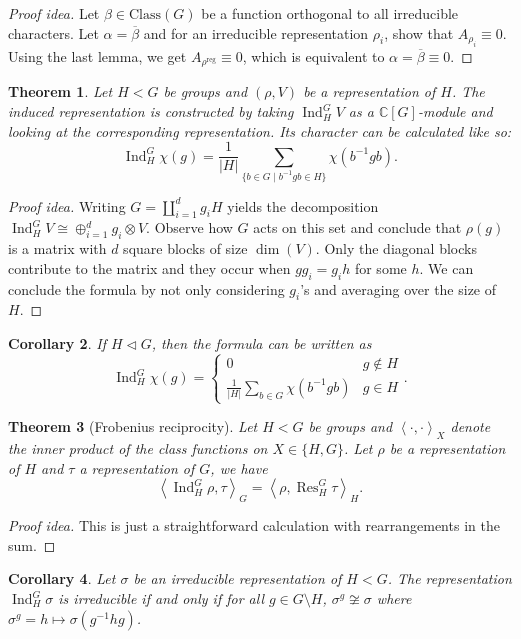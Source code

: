 \documentclass[paper=a4, fontsize=12pt]{scrartcl} %
\newtheorem{thm}{Theorem}
\newtheorem{cor}[thm]{Corollary}
\theoremstyle{definition}
\theoremstyle{remark}
\newcommand{\C}{\mathbb{C}}
\DeclareMathOperator{\Ind}{Ind}
\DeclareMathOperator{\Res}{Res}
\newcommand{\inp}[2]{\left\langle #1, #2 \right\rangle}
\begin{document}
\begin{proof}[Proof idea]
	Let $\beta \in \text{Class}(G)$ be a function orthogonal to all irreducible characters. Let $\alpha = \overline{\beta}$ and for an irreducible representation $\rho_i$, show that $A_{\rho_i} \equiv 0$. Using the last lemma, we get $A_{\rho^{\text{reg}}} \equiv 0$, which is equivalent to $\alpha = \overline{\beta} \equiv 0$.
\end{proof}
\begin{thm}
	Let $H< G$ be groups and $(\rho, V)$ be a representation of $H$. The induced representation is constructed by taking $\Ind_H^GV$ as a $\C[G]$-module and looking at the corresponding representation. Its character can be calculated like so:
	$$\Ind_H^G\chi(g) = \frac{1}{|H|}\sum_{\{b \in G \mid b^{-1}gb \in H\}} \chi(b^{-1}gb).$$
\end{thm}
\begin{proof}[Proof idea]
	Writing $G = \amalg_{i=1}^d g_iH$ yields the decomposition $\Ind_H^GV \cong \oplus_{i=1}^d g_i \otimes V$. Observe how $G$ acts on this set and conclude that $\rho(g)$ is a matrix with $d$ square blocks of size $\dim(V)$. Only the diagonal blocks contribute to the matrix and they occur when $gg_i = g_ih$ for some $h$. We can conclude the formula by not only considering $g_i$'s and averaging over the size of $H$.
\end{proof}
\begin{cor}
	If $H \lhd G$, then the formula can be written as 
	$$\Ind_H^G\chi(g) =\begin{cases}0 & g \notin H\\
	 \frac{1}{|H|}\sum_{b \in G} \chi(b^{-1}gb) & g \in H\end{cases}.$$
\end{cor}
\begin{thm}[Frobenius reciprocity]
	Let $H< G$ be groups and $\inp{\cdot}{\cdot}_X$ denote the inner product of the class functions on $X \in \{H,G\}$. Let $\rho$ be a representation of $H$ and $\tau$ a representation of $G$, we have 
	$$\inp{\Ind_H^G\rho}{\tau}_G = \inp{\rho}{\Res_H^G\tau}_H.$$
\end{thm}
\begin{proof}[Proof idea]
	This is just a straightforward calculation with rearrangements in the sum.
\end{proof}
\begin{cor}
	Let $\sigma$ be an irreducible representation of $H < G$. The representation $\Ind_H^G\sigma$ is irreducible if and only if for all $g \in G \setminus H$, $\sigma^g \not\cong \sigma$ where $\sigma^g = h \mapsto \sigma(g^{-1}hg)$.
\end{cor}
\end{document}
